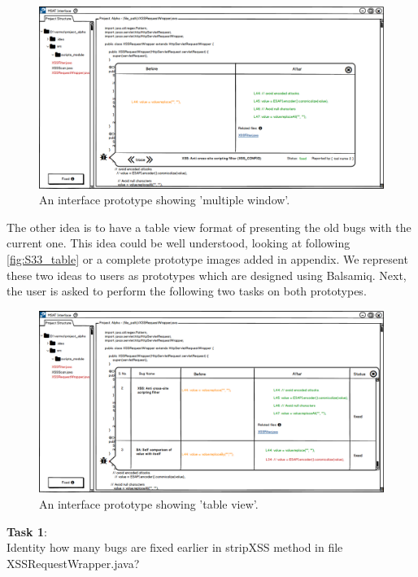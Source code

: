 \begin{figure}[hbt!]
	\centering
	\includegraphics[width=\linewidth]{figures/solution_ideas_snaps/S33_multiple}
	\caption{An interface prototype showing 'multiple window'.}
	\label{fig:S33_multiple}
\end{figure}

The other idea is to have a table view format of presenting the old bugs with the current one. This idea could be well understood, looking at following \autoref{fig:S33_table} or a complete prototype images added in appendix. We represent these two ideas to users as prototypes which are designed using Balsamiq. Next, the user is asked to perform the following two tasks on both prototypes. \\

\begin{figure}[hbt!]
	\centering
	\includegraphics[width=\linewidth]{figures/solution_ideas_snaps/S33_table}
	\caption{An interface prototype showing 'table view'.}
	\label{fig:S33_table}
\end{figure}

\textbf{Task 1}: \\ 

Identity how many bugs are fixed earlier in stripXSS method in file XSSRequestWrapper.java? \\

